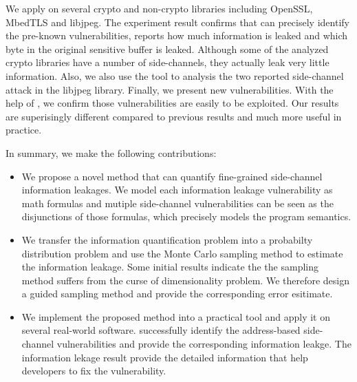 We apply \tool{} on several crypto and non-crypto libraries including OpenSSL,
MbedTLS and libjpeg. The experiment result confirms that \tool{} can precisely identify the pre-known vulnerabilities,
reports how much information is leaked and which byte in the original sensitive buffer is leaked. 
Although some of the analyzed crypto libraries have a number of side-channels, they actually
leak very little information. Also, we also use the tool to analysis the two reported side-channel attack 
in the libjpeg library. Finally, we present new vulnerabilities. With the help of \tool{}, we confirm those
vulnerabilities are easily to be exploited. Our results are superisingly different compared to previous results
and much more useful in practice.

In summary, we make the following contributions:

\begin{itemize}
	\item We propose a novel method that can quantify fine-grained side-channel
        information leakages. We model each information leakage vulnerability as math formulas and 
        mutiple side-channel vulnerabilities can be seen as the disjunctions of those formulas, which
        precisely models the program semantics.
        \item We transfer the information quantification problem into a probabilty distribution problem and 
        use the Monte Carlo sampling method to estimate the information leakage. Some initial results indicate the 
        the sampling method suffers from the curse of dimensionality problem. We therefore design a guided
        sampling method and provide the corresponding error esitimate.
	\item We implement the proposed method into a practical tool and apply it on several real-world software. \tool{} 
        successfully identify the address-based side-channel vulnerabilities and provide the corresponding
        information leakge. The information lekage result provide the detailed information that help developers
        to fix the vulnerability.
\end{itemize}



